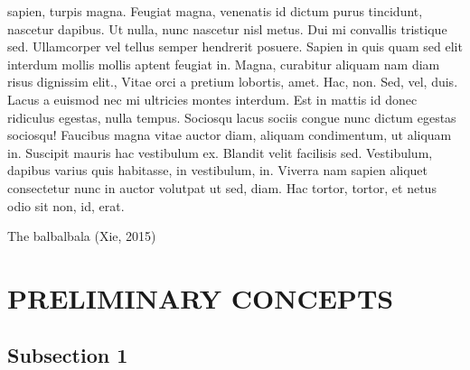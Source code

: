 \documentclass{source/tex/templates/maththesis}
\begin{document}
sapien, turpis magna. Feugiat magna, venenatis id dictum purus tincidunt, nascetur dapibus. Ut nulla, nunc nascetur nisl metus. Dui mi convallis tristique sed. Ullamcorper vel tellus semper hendrerit posuere. Sapien in quis quam sed elit interdum mollis mollis aptent feugiat in. Magna, curabitur aliquam nam diam risus dignissim elit., Vitae orci a pretium lobortis, amet. Hac, non. Sed, vel, duis. Lacus a euismod nec mi ultricies montes interdum. Est in mattis id donec ridiculus egestas, nulla tempus. Sociosqu lacus sociis congue nunc dictum egestas sociosqu! Faucibus magna vitae auctor diam, aliquam condimentum, ut aliquam in. Suscipit mauris hac vestibulum ex. Blandit velit facilisis sed. Vestibulum, dapibus varius quis habitasse, in vestibulum, in. Viverra nam sapien aliquet consectetur nunc in auctor volutpat ut sed, diam. Hac tortor, tortor, et netus odio sit non, id, erat.

The balbalbala (Xie, 2015)

\hypertarget{preliminary-concepts}{%
\chapter{PRELIMINARY CONCEPTS}\label{preliminary-concepts}}

\hypertarget{subsection-1-1}{%
\section{Subsection 1}\label{subsection-1-1}}
\end{document}
